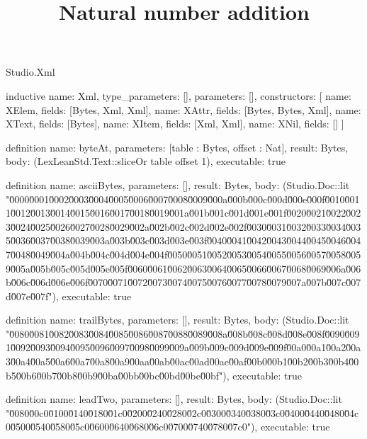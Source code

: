 \begin{lexlean}{Studio.Xml}
\title{Natural number addition}
\begin{semanticmodule}
inductive{
  name: Xml,
  type_parameters: [],
  parameters: [],
  constructors: [
    {name: XElem, fields: [Bytes, Xml, Xml]},
    {name: XAttr, fields: [Bytes, Bytes, Xml]},
    {name: XText, fields: [Bytes]},
    {name: XItem, fields: [Xml, Xml]},
    {name: XNil, fields: []}
  ]
}


definition{
  name: byteAt,
  parameters: [table : Bytes, offset : Nat],
  result: Bytes,
  body: (LexLeanStd.Text::sliceOr table offset 1),
  executable: true
}

definition{
  name: asciiBytes,
  parameters: [],
  result: Bytes,
  body: (Studio.Doc::lit "\u0000\u0001\u0002\u0003\u0004\u0005\u0006\u0007\u0008\u0009\u000a\u000b\u000c\u000d\u000e\u000f\u0010\u0011\u0012\u0013\u0014\u0015\u0016\u0017\u0018\u0019\u001a\u001b\u001c\u001d\u001e\u001f\u0020\u0021\u0022\u0023\u0024\u0025\u0026\u0027\u0028\u0029\u002a\u002b\u002c\u002d\u002e\u002f\u0030\u0031\u0032\u0033\u0034\u0035\u0036\u0037\u0038\u0039\u003a\u003b\u003c\u003d\u003e\u003f\u0040\u0041\u0042\u0043\u0044\u0045\u0046\u0047\u0048\u0049\u004a\u004b\u004c\u004d\u004e\u004f\u0050\u0051\u0052\u0053\u0054\u0055\u0056\u0057\u0058\u0059\u005a\u005b\u005c\u005d\u005e\u005f\u0060\u0061\u0062\u0063\u0064\u0065\u0066\u0067\u0068\u0069\u006a\u006b\u006c\u006d\u006e\u006f\u0070\u0071\u0072\u0073\u0074\u0075\u0076\u0077\u0078\u0079\u007a\u007b\u007c\u007d\u007e\u007f"),
  executable: true
}

definition{
  name: trailBytes,
  parameters: [],
  result: Bytes,
  body: (Studio.Doc::lit "\u0080\u0081\u0082\u0083\u0084\u0085\u0086\u0087\u0088\u0089\u008a\u008b\u008c\u008d\u008e\u008f\u0090\u0091\u0092\u0093\u0094\u0095\u0096\u0097\u0098\u0099\u009a\u009b\u009c\u009d\u009e\u009f\u00a0\u00a1\u00a2\u00a3\u00a4\u00a5\u00a6\u00a7\u00a8\u00a9\u00aa\u00ab\u00ac\u00ad\u00ae\u00af\u00b0\u00b1\u00b2\u00b3\u00b4\u00b5\u00b6\u00b7\u00b8\u00b9\u00ba\u00bb\u00bc\u00bd\u00be\u00bf"),
  executable: true
}

definition{
  name: leadTwo,
  parameters: [],
  result: Bytes,
  body: (Studio.Doc::lit "\u0080\u00c0\u0100\u0140\u0180\u01c0\u0200\u0240\u0280\u02c0\u0300\u0340\u0380\u03c0\u0400\u0440\u0480\u04c0\u0500\u0540\u0580\u05c0\u0600\u0640\u0680\u06c0\u0700\u0740\u0780\u07c0"),
  executable: true
}


\end{semanticmodule}
\end{lexlean}
